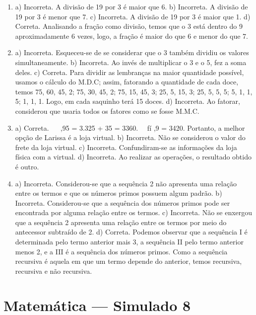 \begin{enumerate}
\item a) Incorreta. A divisão de 19 por 3 é maior que 6.
b) Incorreta. A divisão de 19 por 3 é menor que 7.
c) Incorreta. A divisão de 19 por 3 é maior que 1.
d) Correta. Analisando a fração como divisão, temos que o 3 está dentro do 9 aproximadamente 6 vezes, logo, a fração é maior do que 6 e menor do que 7.

\item a) Incorreta. Esqueceu-se de se considerar que o 3 também dividiu os valores simultaneamente.
b) Incorreta. Ao invés de multiplicar o 3 e o 5, fez a soma deles.
c) Correta. Para dividir as lembranças na maior quantidade possível, usamos o cálculo do M.D.C; assim, fatorando a quantidade de cada doce, temos 75, 60, 45, 2; 75, 30, 45, 2; 75, 15, 45, 3; 25, 5, 15, 3; 25, 5, 5, 5; 5, 1, 1, 5; 1, 1, 1. Logo, em cada saquinho terá 15 doces.
d) Incorreta. Ao fatorar, considerou que usaria todos os fatores como se fosse M.M.C.

\item a) Correta. \ \   ,95 = 3.325 + 35 = 3360. \ \ fí  ,9 = 3420. Portanto, a melhor opção de Larissa é a loja virtual.
b) Incorreta. Não se considerou o valor do frete da loja virtual.
c) Incorreta. Confundiram-se as informações da loja física com a virtual.
d) Incorreta. Ao realizar as operações, o resultado obtido é outro.

\item a) Incorreta. Considerou-se que a sequência 2 não apresenta uma relação entre os termos e que os números primos possuem algum padrão.
b) Incorreta. Considerou-se que a sequência dos números primos pode ser encontrada por alguma relação entre os termos.
c) Incorreta. Não se enxergou que a sequência 2 apresenta uma relação entre os termos por meio do antecessor subtraído de 2.
d) Correta. Podemos observar que a sequência I é determinada pelo termo anterior mais 3, a sequência II pelo termo anterior menos 2, e a
III é a sequência dos números primos. Como a sequência recursiva é aquela em que um termo depende do anterior, temos recursiva, recursiva e não recursiva.
\end{enumerate}

\section*{Matemática — Simulado 8} 

